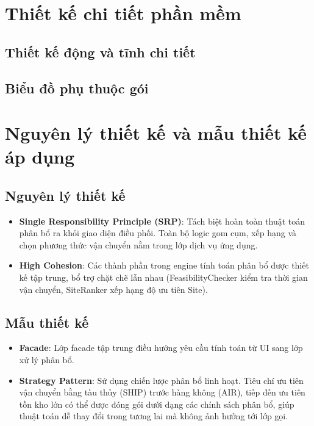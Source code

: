 \documentclass[12pt]{extreport}
\begin{document}
\chapter{Thiết kế chi tiết phần mềm}
\section{Thiết kế động và tĩnh chi tiết}

\section{Biểu đồ phụ thuộc gói}

\chapter{Nguyên lý thiết kế và mẫu thiết kế áp dụng}
\section{Nguyên lý thiết kế}
\begin{itemize}
    \item \textbf{Single Responsibility Principle (SRP)}: Tách biệt hoàn toàn thuật toán phân bổ ra khỏi giao diện điều phối. Toàn bộ logic gom cụm, xếp hạng và chọn phương thức vận chuyển nằm trong lớp dịch vụ ứng dụng.
    \item \textbf{High Cohesion}: Các thành phần trong engine tính toán phân bổ được thiết kế tập trung, bổ trợ chặt chẽ lẫn nhau (FeasibilityChecker kiểm tra thời gian vận chuyển, SiteRanker xếp hạng độ ưu tiên Site).
\end{itemize}

\section{Mẫu thiết kế}
\begin{itemize}
    \item \textbf{Facade}: Lớp facade tập trung điều hướng yêu cầu tính toán từ UI sang lớp xử lý phân bổ.
    \item \textbf{Strategy Pattern}: Sử dụng chiến lược phân bổ linh hoạt. Tiêu chí ưu tiên vận chuyển bằng tàu thủy (SHIP) trước hàng không (AIR), tiếp đến ưu tiên tồn kho lớn có thể được đóng gói dưới dạng các chính sách phân bổ, giúp thuật toán dễ thay đổi trong tương lai mà không ảnh hưởng tới lớp gọi.
\end{itemize}
\end{document}
